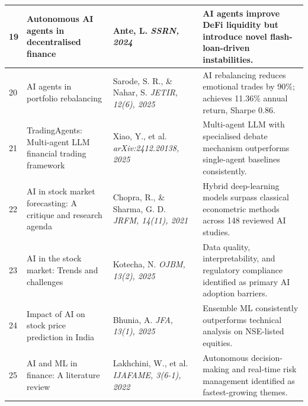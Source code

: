 \documentclass[12pt,a4paper,oneside]{report}
\theoremstyle{definition}
\theoremstyle{remark}
\begin{document}
\begin{center}
\begin{longtable}{|p{0.8cm}|p{4.2cm}|>{\raggedright\arraybackslash}p{4cm}|p{4.5cm}|}
19 & Autonomous AI agents in decentralised finance \cite{Ante2024AIAgentsDeFi} & Ante, L. \newline\newline \textit{SSRN, 2024} & AI agents improve DeFi liquidity but introduce novel flash-loan-driven instabilities. \\ \hline

20 & AI agents in portfolio rebalancing \cite{Sarode2025AIRebalancing} & Sarode, S. R., \& Nahar, S. \newline\newline \textit{JETIR, 12(6), 2025} & AI rebalancing reduces emotional trades by 90\%; achieves 11.36\% annual return, Sharpe 0.86. \\ \hline

21 & TradingAgents: Multi-agent LLM financial trading framework \cite{Xiao2025TradingAgents} & Xiao, Y., et al. \newline\newline \textit{arXiv:2412.20138, 2025} & Multi-agent LLM with specialised debate mechanism outperforms single-agent baselines consistently. \\ \hline

22 & AI in stock market forecasting: A critique and research agenda \cite{Chopra2021AIStockReview} & Chopra, R., \& Sharma, G. D. \newline\newline \textit{JRFM, 14(11), 2021} & Hybrid deep-learning models surpass classical econometric methods across 148 reviewed AI studies. \\ \hline

23 & AI in the stock market: Trends and challenges \cite{Kotecha2025AIStockTrends} & Kotecha, N. \newline\newline \textit{OJBM, 13(2), 2025} & Data quality, interpretability, and regulatory compliance identified as primary AI adoption barriers. \\ \hline

24 & Impact of AI on stock price prediction in India \cite{Bhunia2025AIStockPrediction} & Bhunia, A. \newline\newline \textit{JFA, 13(1), 2025} & Ensemble ML consistently outperforms technical analysis on NSE-listed equities. \\ \hline

25 & AI and ML in finance: A literature review \cite{Lakhchini2022AIMLFinance} & Lakhchini, W., et al. \newline\newline \textit{IJAFAME, 3(6-1), 2022} & Autonomous decision-making and real-time risk management identified as fastest-growing themes. \\ \hline


\end{longtable}
\end{center}
\end{document}

